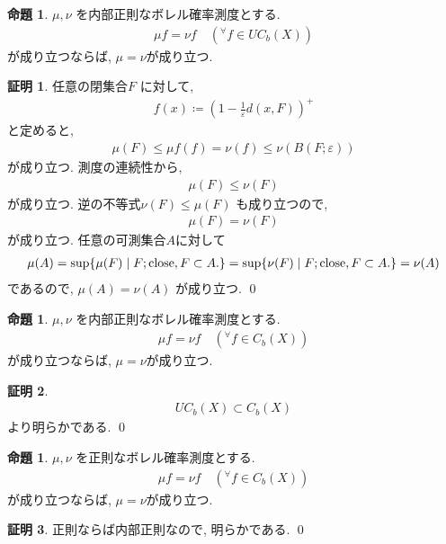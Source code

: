 \documentclass[10pt, fleqn, label-section=none]{bxjsarticle}
\theoremstyle{definition}
\newtheorem{prop}[dfn]{命題}
\newtheorem*{pf*}{証明}
\newcommand{\any}{{}^{\forall}}
\newcommand{\veps}{\varepsilon}
\newcommand{\cbra}[1]{\mleft\{#1\mright\}}
\renewcommand{\;}{\, ; \,}
\begin{document}
\begin{prop}
$\mu, \nu$ を内部正則なボレル確率測度とする. 
\begin{align*} \mu f = \nu f \quad (\any f \in UC_{b} (X) )\end{align*}
が成り立つならば, $\mu = \nu$が成り立つ. 
\end{prop}
\begin{pf*}任意の閉集合$F$ に対して, 
\begin{align*} f(x) \coloneqq (1 - \frac{1}{\veps} d(x, F))^+  \end{align*}
と定めると, 
\begin{align*} \mu(F) \leq \mu f(f) = \nu (f) \leq \nu(B(F; \veps) )  \end{align*}
が成り立つ. 測度の連続性から, 
\begin{align*} \mu(F) \leq \nu (F) \end{align*}
が成り立つ. 逆の不等式$\nu(F) \leq \mu(F)$ も成り立つので, 
\begin{align*} \mu(F) = \nu(F) \end{align*}
が成り立つ. 任意の可測集合$A$に対して
\begin{align*} \mu(A) = \sup \cbra{\mu (F) \mid F;\textrm{close}, F \subset A. } =  \sup \cbra{\nu (F) \mid F;\textrm{close}, F \subset A. } = \nu(A) \end{align*}
であるので, $\mu(A) = \nu(A)$ が成り立つ.
\qed
\end{pf*}

\begin{prop}
$\mu, \nu$ を内部正則なボレル確率測度とする. 
\begin{align*} \mu f = \nu f \quad (\any f \in C_{b} (X) )\end{align*}
が成り立つならば, $\mu = \nu$が成り立つ. 
\end{prop}
\begin{pf*}
\begin{align*} UC_b(X) \subset C_b(X) \end{align*}
より明らかである.
\qed
\end{pf*}

\begin{prop}
$\mu, \nu$ を正則なボレル確率測度とする. 
\begin{align*} \mu f = \nu f \quad (\any f \in C_{b} (X) )\end{align*}
が成り立つならば, $\mu = \nu$が成り立つ. 
\end{prop}
\begin{pf*}
正則ならば内部正則なので, 明らかである.
\qed
\end{pf*}
\end{document}

